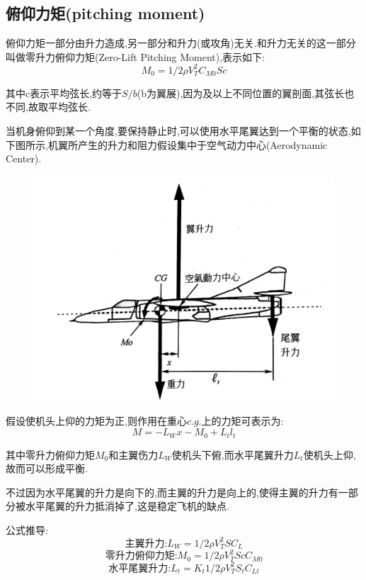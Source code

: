 \documentclass[9pt, oneside]{book}
\begin{document}
\subsection{俯仰力矩(pitching moment)}

俯仰力矩一部分由升力造成,另一部分和升力(或攻角)无关.和升力无关的这一部分叫做零升力俯仰力矩(Zero-Lift Pitching Moment),表示如下:
\begin{equation}
    M_0 = 1/2\rho V_T^2C_{M0}Sc
\end{equation}

其中c表示平均弦长,约等于$S/b$(b为翼展),因为及以上不同位置的翼剖面,其弦长也不同,故取平均弦长.


当机身俯仰到某一个角度,要保持静止时,可以使用水平尾翼达到一个平衡的状态,如下图所示,机翼所产生的升力和阻力假设集中于空气动力中心(Aerodynamic Center).

\begin{figure}[H]
    \centering
    \includegraphics[width=0.5\linewidth]{image/2-18.jpg}
\end{figure}

假设使机头上仰的力矩为正,则作用在重心$c.g.$上的力矩可表示为:
\begin{equation}
    M = -L_Wx - M_0 + L_tl_t
\end{equation}

其中零升力俯仰力矩$M_0$和主翼伤力$L_W$使机头下俯,而水平尾翼升力$L_t$使机头上仰,故而可以形成平衡.

不过因为水平尾翼的升力是向下的,而主翼的升力是向上的,使得主翼的升力有一部分被水平尾翼的升力抵消掉了,这是稳定飞机的缺点.

公式推导:
\begin{equation}
    \mbox{主翼升力:} L_W = 1/2\rho V_T^2SC_L
\end{equation}
\begin{equation}
    \mbox{零升力俯仰力矩:} M_0 = 1/2\rho V_T^2ScC_{M0}
\end{equation}
\begin{equation}
    \mbox{水平尾翼升力:} L_t = K_t1/2\rho V_T^2S_tC_{Lt}
\end{equation}
\end{document}
